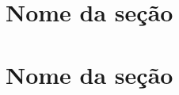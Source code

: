 \documentclass[a4paper, 12pt]{article}
\begin{document}
\section{Nome da seção}
\lipsum[10]

\section*{Nome da seção} %
\lipsum[10]
\end{document}
